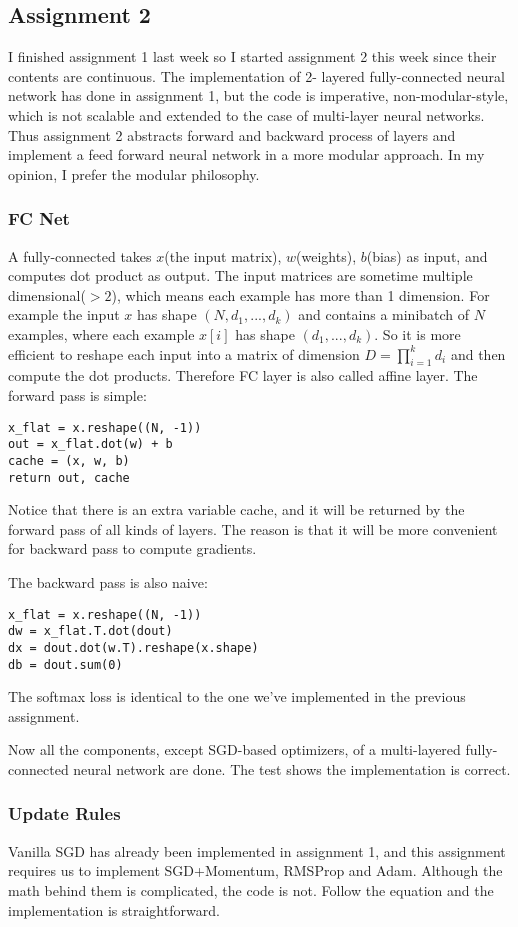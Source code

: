 \documentclass{article} %
\begin{document}
\subsection{Assignment 2}
I finished assignment 1 last week so I started assignment 2 this week since their contents are continuous. The implementation of 2- layered fully-connected neural network has done in assignment 1, but the code is imperative, non-modular-style, which is not scalable and extended to the case of multi-layer neural networks. Thus assignment 2 abstracts forward and backward process of layers and implement a feed forward neural network in a more modular approach. In my opinion, I prefer the modular philosophy.

\subsubsection{FC Net}
A fully-connected takes $x$(the input matrix), $w$(weights), $b$(bias) as input, and computes dot product as output. The input matrices are sometime multiple dimensional($> 2$), which means each example has more than 1 dimension. For example the input $x$ has shape $(N, d_1, ..., d_k)$ and contains a minibatch of $N$ examples, where each example $x[i]$ has shape $(d_1, ..., d_k)$. So it is more efficient to reshape each input into a matrix of dimension $D=\prod_{i=1}^k d_i$ and then compute the dot products. Therefore FC layer is also called affine layer. The forward pass is simple:
\begin{lstlisting}
x_flat = x.reshape((N, -1))
out = x_flat.dot(w) + b
cache = (x, w, b)
return out, cache
\end{lstlisting}
Notice that there is an extra variable cache, and it will be returned by the forward pass of all kinds of layers. The reason is that it will be more convenient for backward pass to compute gradients.

The backward pass is also naive:
\begin{lstlisting}
x_flat = x.reshape((N, -1))
dw = x_flat.T.dot(dout)
dx = dout.dot(w.T).reshape(x.shape)
db = dout.sum(0)
\end{lstlisting}
The softmax loss is identical to the one we've implemented in the previous assignment.

Now all the components, except SGD-based optimizers, of a multi-layered fully-connected neural network are done. The test shows the implementation is correct.

\subsubsection{Update Rules}
Vanilla SGD has already been implemented in assignment 1, and this assignment requires us to implement SGD+Momentum, RMSProp and Adam. Although the math behind them is complicated, the code is not. Follow the equation and the implementation is straightforward.
\end{document}
